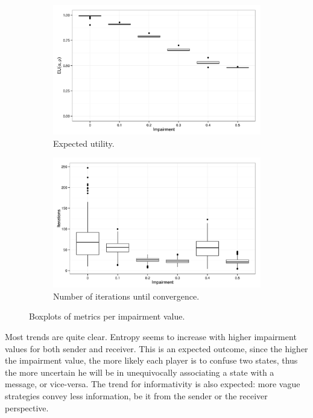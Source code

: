 \begin{figure}
        \begin{subfigure}{0.45\textwidth}
                \includegraphics[width=\textwidth]{plots/Expected-utility-20140813-194306}
                \caption{Expected utility.}
        \end{subfigure}
        \begin{subfigure}{0.45\textwidth}
                \includegraphics[width=\textwidth]{plots/Iterations-20140813-194306}
                \caption{Number of iterations until convergence.}
        \end{subfigure}
        \caption{Boxplots of metrics per impairment value.}
        \label{fig:metrics-boxplots}
\end{figure}
%
Most trends are quite clear.
Entropy seems to increase with higher impairment values for both sender and receiver.
This is an expected outcome, since the higher the impairment value, the more likely each player is to confuse two states, thus the more uncertain he will be in unequivocally associating a state with a message, or vice-versa.
The trend for informativity is also expected: more vague strategies convey less information, be it from the sender or the receiver perspective.

